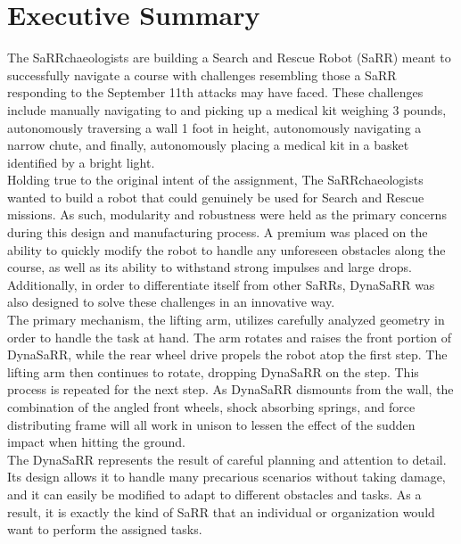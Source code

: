 \documentclass[12pt]{article}
\begin{document}



\section{Executive Summary}
The SaRRchaeologists are building a Search and Rescue Robot (SaRR) meant to successfully navigate a course with challenges resembling those a SaRR responding to the September 11th attacks may have faced. These challenges include manually navigating to and picking up a medical kit weighing 3 pounds, autonomously traversing a wall 1 foot in height, autonomously navigating a narrow chute, and finally, autonomously placing a medical kit in a basket identified by a bright light. \\

Holding true to the original intent of the assignment, The SaRRchaeologists wanted to build a robot that could genuinely be used for Search and Rescue missions. As such, modularity and robustness were held as the primary concerns during this design and manufacturing process. A premium was placed on the ability to quickly modify the robot to handle any unforeseen obstacles along the course, as well as its ability to withstand strong impulses and large drops. Additionally, in order to differentiate itself from other SaRRs, DynaSaRR was also designed to solve these challenges in an innovative way.\\

The primary mechanism, the lifting arm, utilizes carefully analyzed geometry in order to handle the task at hand. The arm rotates and raises the front portion of DynaSaRR, while the rear wheel drive propels the robot atop the first step. The lifting arm then continues to rotate, dropping DynaSaRR on the step. This process is repeated for the next step. As DynaSaRR dismounts from the wall, the combination of the angled front wheels, shock absorbing springs, and force distributing frame will all work in unison to lessen the effect of the sudden impact when hitting the ground. \\

The DynaSaRR represents the result of careful planning and attention to detail. Its design allows it to handle many precarious scenarios without taking damage, and it can easily be modified to adapt to different obstacles and tasks. As a result, it is exactly the kind of SaRR that an individual or organization would want to perform the assigned tasks.


\newpage
\end{document}
